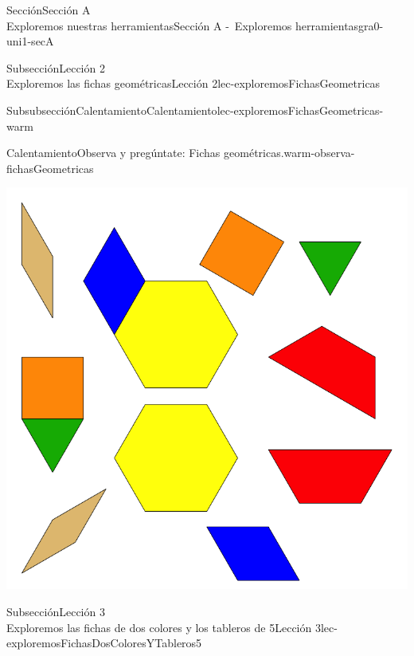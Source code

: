 \begin{sectionptx}{Sección}{{\Large Sección A\\}Exploremos nuestras herramientas}{}{Sección A -~Exploremos herramientas}{}{}{gra0-uni1-secA}
\begin{subsectionptx}{Subsección}{{\normalsize Lección 2\\[-0.05cm]}Exploremos las fichas geométricas}{}{Lección 2}{}{}{lec-exploremosFichasGeometricas}
\begin{subsubsectionptx}{Subsubsección}{Calentamiento}{}{Calentamiento}{}{}{lec-exploremosFichasGeometricas-warm}
\begin{exploration}{Calentamiento}{Observa y pregúntate: Fichas geométricas.}{warm-observa-fichasGeometricas}
\begin{image}{0}{1}{0}{}
\includegraphics[max width=0.65\linewidth, center]{external/svg-source/tikz-file-148141.pdf}
\end{image}%
\end{exploration}%
\end{subsubsectionptx}
%
%
\typeout{************************************************}
\typeout{************************************************}
%
\end{subsectionptx}
%
%
\typeout{************************************************}
\typeout{************************************************}
%
\begin{subsectionptx}{Subsección}{{\normalsize Lección 3\\[-0.05cm]}Exploremos las fichas de dos colores y los tableros de 5}{}{Lección 3}{}{}{lec-exploremosFichasDosColoresYTableros5}
%
%
\typeout{************************************************}
\typeout{************************************************}

\end{subsectionptx}
\end{sectionptx}
